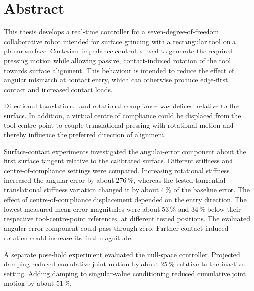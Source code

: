 \chapter*{Abstract}

This thesis develops a real-time controller for a seven-degree-of-freedom
collaborative robot intended for surface grinding with a rectangular tool on a
planar surface. Cartesian impedance control is used to generate the required
pressing motion while allowing passive, contact-induced rotation of the tool
towards surface alignment. This behaviour is intended to reduce the effect of
angular mismatch at contact entry, which can otherwise produce edge-first
contact and increased contact loads.

Directional translational and rotational compliance was defined relative to the
surface. In addition, a virtual centre of compliance could be displaced from the
tool centre point to couple translational pressing with rotational motion and
thereby influence the preferred direction of alignment.

Surface-contact experiments investigated the angular-error component
about the first surface tangent relative to the calibrated surface.
Different stiffness and centre-of-compliance settings were compared.
Increasing rotational stiffness increased the angular error by about
\(276\,\%\), whereas the tested tangential translational stiffness variation
changed it by about \(4\,\%\) of the baseline error.
The effect of centre-of-compliance displacement depended on the entry
direction. The lowest measured mean error magnitudes were about
\(53\,\%\) and \(34\,\%\) below their respective tool-centre-point references,
at different tested positions.
The evaluated angular-error component could pass through zero.
Further contact-induced rotation could increase its final magnitude.

A separate pose-hold experiment evaluated the null-space controller. Projected
damping reduced cumulative joint motion by about \(25\,\%\) relative to
the inactive setting. Adding damping to singular-value conditioning reduced
cumulative joint motion by about \(51\,\%\).
